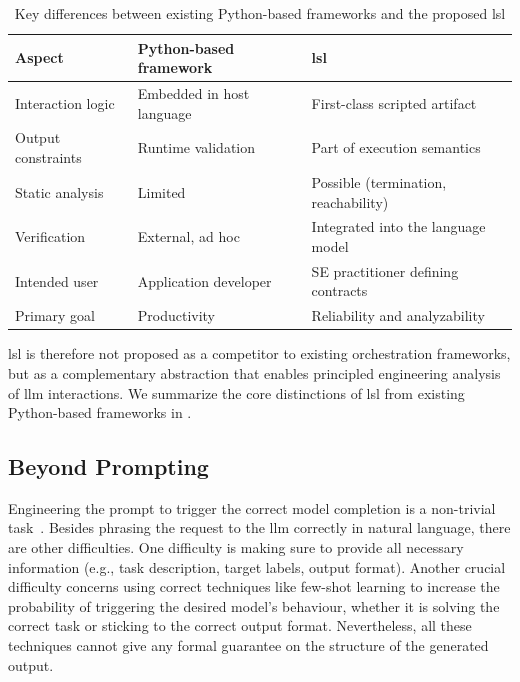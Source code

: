 \documentclass[manuscript,screen]{acmart}
\begin{document}
\begin{table}[!ht]
\caption{Key differences between existing Python-based frameworks and the proposed \ac{lsl}}
\begin{center}
\begin{tabular}{lll}
\toprule

\textbf{Aspect} & \textbf{Python-based framework} & \textbf{\ac{lsl}} \\

\midrule

Interaction logic & Embedded in host language & First-class scripted artifact \\
Output constraints & Runtime validation & Part of execution semantics \\
Static analysis & Limited & Possible (termination, reachability) \\
Verification & External, ad hoc & Integrated into the language model \\
Intended user & Application developer & SE practitioner defining contracts \\
Primary goal & Productivity & Reliability and analyzability \\

\bottomrule

\end{tabular}
\end{center}
\label{tab:distinction}
\end{table}%

\ac{lsl} is therefore not proposed as a competitor to existing orchestration frameworks, but as a complementary abstraction that enables principled engineering analysis of \ac{llm} interactions.
We summarize the core distinctions of \ac{lsl} from existing Python-based frameworks in .

\subsection{Beyond Prompting}
\label{sec:beyondprompting}


Engineering the prompt to trigger the correct model completion is a non-trivial task~\cite{DBLP:conf/iclr/SanhWRBSACSRDBX22,DBLP:journals/jmlr/ChungHLZTFL00BW24}.
Besides phrasing the request to the \ac{llm} correctly in natural language, there are other difficulties.
One difficulty is making sure to provide all necessary information (e.g., task description, target labels, output format).
Another crucial difficulty concerns using correct techniques like few-shot learning to increase the probability of triggering the desired model's behaviour, whether it is solving the correct task or sticking to the correct output format.
Nevertheless, all these techniques cannot give any formal guarantee on the structure of the generated output.
\end{document}
